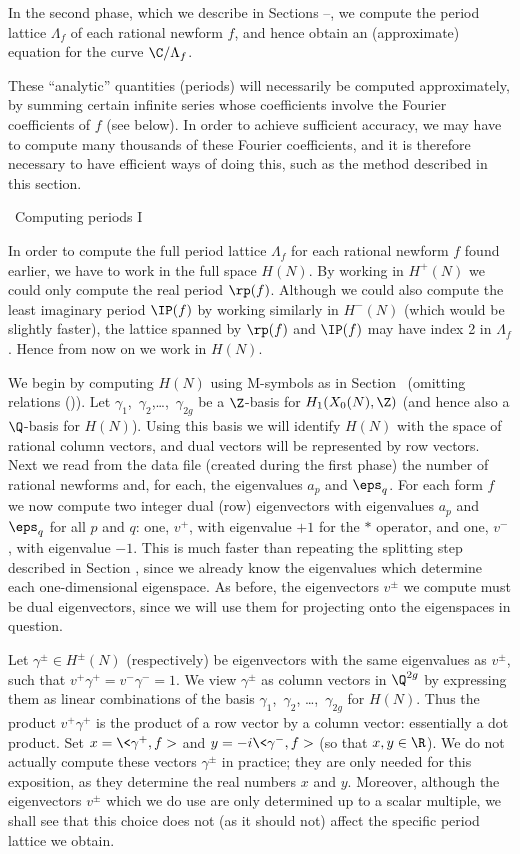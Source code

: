In the second phase, which we describe in Sections \PerI--\Eqns, we
compute the period lattice $\Lambda_f$ of each rational newform $f$,
and hence obtain an (approximate) equation for the curve
$\C/\Lambda_f$.

These ``analytic'' quantities (periods) will necessarily be computed
approximate\-ly, by summing certain infinite series whose coefficients
involve the Fourier coefficients of $f$ (see below).  In order to
achieve sufficient accuracy, we may have to compute many thousands of
these Fourier coefficients, and it is therefore necessary to have
efficient ways of doing this, such as the method described in this
section. 


%
%
\beginsection{\PerI}
\head \sec\ Computing periods I \endhead

In order to compute the full period lattice $\Lambda_f$ for each rational
newform $f$ found earlier, we have to work in the full space $H(N)$.   By
working in $H^+(N)$ we could only compute the real period $\rp(f)$.
Although we could also compute the least imaginary period $\IP(f)$ by
working similarly in $H^-(N)$ (which would be slightly faster), the lattice
spanned by $\rp(f)$ and $\IP(f)$ may have index 2 in $\Lambda_f$.   Hence
from now on we work in $H(N)$.

We begin by computing $H(N)$ using M-symbols as in Section \Msymb\
(omitting relations (\mextra)).  Let
$\gamma_1$,~$\gamma_2$,\dots,~$\gamma_{2g}$ be a $\Z$-basis for
$H_1(X_0(N),\Z)$ (and hence also a $\Q$-basis for $H(N)$).  Using this
basis we will identify $H(N)$ with the space of rational column
vectors, and dual vectors will be represented by row vectors.  Next we
read from the data file (created during the first phase) the number of
rational newforms and, for each, the eigenvalues $a_p$ and $\eps_q$.
For each form $f$ we now compute two integer dual (row) eigenvectors
with eigenvalues $a_p$ and $\eps_q$ for all $p$ and $q$: one, $v^+$,
with eigenvalue $+1$ for the $*$ operator, and one, $v^-$, with
eigenvalue $-1$.  This is much faster than repeating the splitting
step described in Section \Split, since we already know the
eigenvalues which determine each one-dimensional eigenspace.  As
before, the eigenvectors $v^{\pm}$ we compute must be dual
eigenvectors, since we will use them for projecting onto the
eigenspaces in question.

Let $\gamma^{\pm} \in H^{\pm}(N)$ (respectively) be eigenvectors with the
same eigenvalues as $v^{\pm}$, such that
$v^{+}\gamma^{+} = v^{-}\gamma^{-} = 1$.
We view $\gamma^{\pm}$ as column vectors in $\Q^{2g}$ by expressing them as
linear combinations of the basis $\gamma_1$,~$\gamma_2$, \dots,~$\gamma_{2g}$ 
for $H(N)$.  Thus the product $v^{+}\gamma^{+}$ is the product of a row
vector by a column vector: essentially a dot product.
Set $x = \<\gamma^+,f>$ and
$y=-i\<\gamma^-,f>$ (so that $x,y\in\R$).  We do not actually compute
these vectors $\gamma^{\pm}$ in practice; they are only needed for this
exposition, as they determine the real numbers $x$ and $y$.  Moreover,
although the eigenvectors $v^{\pm}$ which we do use are only determined up
to a scalar multiple, we shall see that this choice does not (as it
should not) affect the specific period lattice we obtain.

